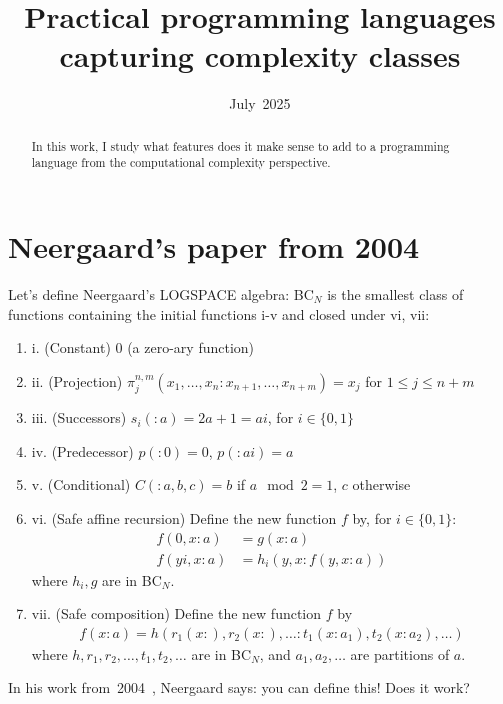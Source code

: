 \documentclass[en]  {pracamgr}
\title{Practical programming languages capturing complexity classes}
\date{July~2025}
\begin{document}
\maketitle

\begin{abstract}
  In this work, I study what features does it make sense to add to a programming language
  from the computational complexity perspective.
\end{abstract}

\tableofcontents

\chapter*{Neergaard's paper from 2004}

Let's define Neergaard's LOGSPACE algebra: BC$_N$ is the smallest class
of functions containing the initial functions i-v and closed under vi, vii:
\begin{enumerate}
  \item i. (Constant) 0 (a zero-ary function)
  \item ii. (Projection) $\pi_j^{n, m}(x_1, \dots, x_n : x_{n+1}, \dots, x_{n+m}) = x_j$ for $1 \leq j \leq n+m$
  \item iii. (Successors) $s_i(:a) = 2a + 1 = ai$, for $i \in \{0, 1\}$
  \item iv. (Predecessor) $p(: 0) = 0$, $p(: ai) = a$
  \item v. (Conditional) $C(: a, b, c) = b$ if $a \mod 2 = 1$, $c$ otherwise
  \item vi. (Safe affine recursion) Define the new function $f$ by, for $i \in \{0, 1\}$:
    \begin{align*}
      f(0, x: a) &= g(x:a) \\
      f(yi, x: a) &= h_i(y, x: f(y, x : a))
    \end{align*}
    where $h_i, g$ are in BC$_N$.
  \item vii. (Safe composition) Define the new function $f$ by
    \begin{align*}
      f(x : a) = h(r_1(x:), r_2(x:), \dots : t_1(x : a_1), t_2(x : a_2), \dots)
    \end{align*}
    where $h, r_1, r_2, \dots, t_1, t_2, \dots$ are in BC$_N$, and $a_1, a_2, \dots$ are partitions of $a$.
\end{enumerate}

In his work from~2004~\cite{10.1007/978-3-540-30477-7_21}, Neergaard says:
you can define this! Does it work?
\end{document}

